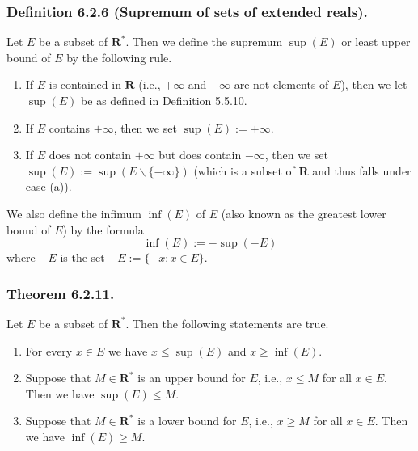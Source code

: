 \documentclass[12pt, letter]{article}
\begin{document}
\subsubsection*{Definition 6.2.6 (Supremum of sets of extended reals).}
Let $E$ be a subset of $\mathbf{R^*}$. Then we define the supremum $\sup(E)$ or least upper bound of $E$ by the following rule. 
\begin{enumerate}[label=(\alph*)]
    \item If $E$ is contained in $\mathbf{R}$ (i.e., $+\infty$ and $-\infty$ are not elements of $E$), then we let $\sup(E)$ be as defined in Definition 5.5.10.
    \item If $E$ contains $+\infty$, then we set $\sup(E):=+\infty$.
    \item If $E$ does not contain $+\infty$ but does contain $-\infty$, then we set $\sup(E):=\sup(E\backslash\{-\infty\})$ (which is a subset of $\mathbf{R}$ and thus falls under case (a)).
\end{enumerate}
We also define the infimum $\inf(E)$ of $E$ (also known as the greatest lower bound of $E$) by the formula $$\inf(E):=-\sup(-E)$$ where $-E$ is the set $-E:=\{-x:x\in E\}$.
\subsubsection*{Theorem 6.2.11.}
Let $E$ be a subset of $\mathbf{R^*}$. Then the following statements are true.
\begin{enumerate}[label=(\alph*)]
    \item For every $x\in E$ we have $x\leq \sup(E)$ and $x\geq \inf(E)$.
    \item Suppose that $M\in\mathbf{R^*}$ is an upper bound for $E$, i.e., $x\leq M$ for all $x\in E$. Then we have $\sup(E)\leq M$.
    \item Suppose that $M\in\mathbf{R^*}$ is a lower bound for $E$, i.e., $x\geq M$ for all $x\in E$. Then we have $\inf(E)\geq M$. 
\end{enumerate}
\end{document}
